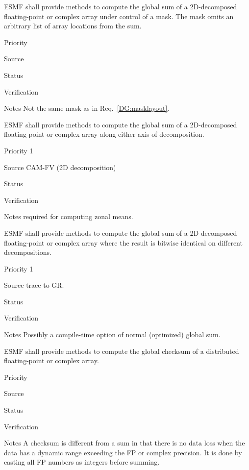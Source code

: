 ESMF shall provide methods to compute the global sum of a 2D-decomposed
floating-point or complex array under control of a mask. The mask
omits an arbitrary list of array locations from the sum.

\begin{reqlist}
\item[Priority]
\item[Source]
\item[Status]
\item[Verification]
\item[Notes] Not the same mask as in Req.~\ref{DG:masklayout}.
\end{reqlist}


ESMF shall provide methods to compute the global sum of a 2D-decomposed
floating-point or complex array along either axis of decomposition.

\begin{reqlist}
\item[Priority] 1
\item[Source] CAM-FV (2D decomposition)
\item[Status]
\item[Verification]
\item[Notes] required for computing zonal means.
\end{reqlist}


ESMF shall provide methods to compute the global sum of a
2D-decomposed floating-point or complex array where the result is
bitwise identical on different decompositions.

\begin{reqlist}
\item[Priority] 1
\item[Source] trace to GR.
\item[Status]
\item[Verification]
\item[Notes] Possibly a compile-time option of normal (optimized)
             global sum.
\end{reqlist}


ESMF shall provide methods to compute the global checksum of a
distributed floating-point or complex array. 

\begin{reqlist}
\item[Priority]
\item[Source]
\item[Status]
\item[Verification]
\item[Notes] A checksum is different from a sum in that there is no
  data loss when the data has a dynamic range exceeding the FP or
  complex precision. It is done by casting all FP numbers as integers
  before summing.
\end{reqlist}

